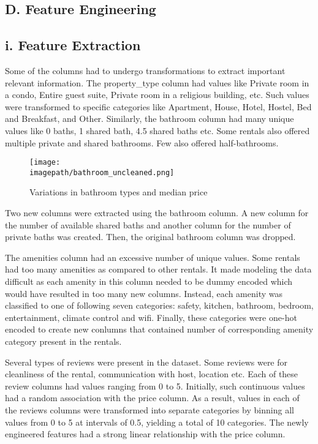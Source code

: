 \documentclass[conference]{IEEEtran}
\newcommand{\imagepath}{C:/Users/Lenovo/Desktop/SEM 6/BIG DATA/BIG_DATA_COURSEWORK/Images for Latex/}
\begin{document}
\subsection*{\centering D. Feature Engineering}
\subsection*{\centering i. Feature Extraction}
Some of the columns had to undergo transformations to extract important relevant information. The property\_type column had values like Private room in a condo, Entire guest suite, Private room in a religious building, etc. Such values were transformed to specific categories like Apartment, House, Hotel, Hostel, Bed and Breakfast, and Other. Similarly, the bathroom column had many unique values like  0 baths, 1 shared bath, 4.5 shared baths etc. Some rentals also offered multiple private and shared bathrooms. Few also offered half-bathrooms. 

\begin{figure}[H]
  \centering
  \texttt{[image: \\imagepath/bathroom\_uncleaned.png]}
  \caption{Variations in bathroom types and median price}
  \label{fig: your_label}
\end{figure}

Two new columns were extracted using the bathroom column. A new column for the number of available shared baths and another column for the number of private baths was created. Then, the original bathroom column was dropped. \newline

The amenities column had an excessive number of unique values. Some rentals had too many amenities as compared to other rentals. It made modeling the data difficult as each amenity in this column needed to be dummy encoded which would have resulted in too many new columns. Instead, each amenity was classified to one of following seven categories: safety, kitchen, bathroom, bedroom, entertainment, climate control and wifi. Finally, these categories were one-hot encoded to create new conlumns that contained number of corresponding amenity category present in the rentals.\newline

Several types of reviews were present in the dataset. Some reviews were for cleanliness of the rental, communication with host, location etc. Each of these review columns had values ranging from 0 to 5. Initially, such continuous values had a random association with the price column. As a result, values in each of the reviews columns were transformed into separate categories by binning all values from 0 to 5 at intervals of 0.5, yielding a total of 10 categories. The newly engineered features had a strong linear relationship with the price column. \newline
\end{document}
